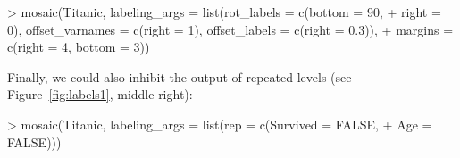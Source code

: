 \documentclass{Z}
\begin{document}
\begin{Schunk}
\begin{Sinput}
> mosaic(Titanic, labeling_args = list(rot_labels = c(bottom = 90, 
+     right = 0), offset_varnames = c(right = 1), offset_labels = c(right = 0.3)), 
+     margins = c(right = 4, bottom = 3))
\end{Sinput}
\end{Schunk}


\noindent Finally, we could also inhibit the output of repeated levels 
(see Figure~\ref{fig:labels1}, middle right):

\begin{Schunk}
\begin{Sinput}
> mosaic(Titanic, labeling_args = list(rep = c(Survived = FALSE, 
+     Age = FALSE)))
\end{Sinput}
\end{Schunk}
\end{document}
